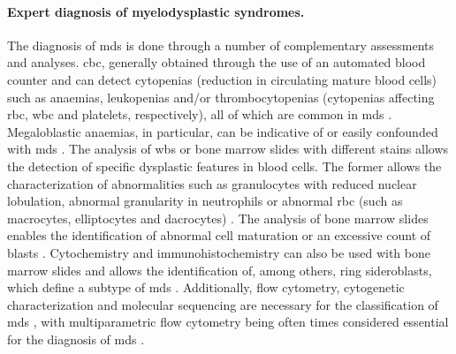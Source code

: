 \paragraph{Expert diagnosis of myelodysplastic syndromes.} The diagnosis of \ac{mds} is done through a number of complementary assessments and analyses. \Ac{cbc}, generally obtained through the use of an automated blood counter and can detect cytopenias (reduction in circulating mature blood cells) such as anaemias, leukopenias and/or thrombocytopenias (cytopenias affecting \ac{rbc}, \ac{wbc} and platelets, respectively), all of which are common in \ac{mds} \cite{Najean1989-qm,Campo2017-wi}. Megaloblastic anaemias, in particular, can be indicative of or easily confounded with \ac{mds} \cite{Kaferle2009-pl,Vasekova2016-vo,Corey2007-cs}. The analysis of \ac{wbs} or bone marrow slides with different stains allows the detection of specific dysplastic features in blood cells. The former allows the characterization of abnormalities such as granulocytes with reduced nuclear lobulation, abnormal granularity in neutrophils or abnormal \ac{rbc} (such as macrocytes, elliptocytes and dacrocytes) \cite{Campo2017-wi,Langenhuijsen1984-qx,Kuriyama1986-ts,Davey1988-zn}. The analysis of bone marrow slides enables the identification of abnormal cell maturation or an excessive count of blasts \cite{Aster2020-cu}. Cytochemistry and immunohistochemistry can also be used with bone marrow slides and allows the identification of, among others, ring sideroblasts, which define a subtype of \ac{mds} \cite{Campo2017-wi,Mufti2008-ye}. Additionally, flow cytometry, cytogenetic characterization and molecular sequencing are necessary for the classification of \ac{mds} \cite{Aster2020-cu,Porwit2014-zi,Greenberg2012-en}, with multiparametric flow cytometry being often times considered essential for the diagnosis of \ac{mds} \cite{Cremers2016-fs}.

